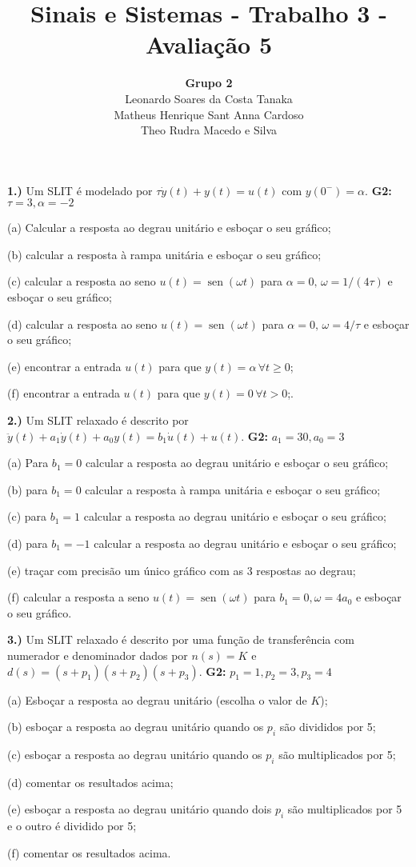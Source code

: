 \documentclass{article}
\title{Sinais e Sistemas - Trabalho 3 - Avaliação 5}
\author{
    \textbf{Grupo 2}\\
    Leonardo Soares da Costa Tanaka\\
    Matheus Henrique Sant Anna Cardoso\\
    Theo Rudra Macedo e Silva
}
\date{}
\DeclareMathOperator{\sen}{sen}
\begin{document}
\maketitle
\thispagestyle{capa}

\newpage

\textbf{1.)} Um SLIT é modelado por $\tau \dot{y}(t) + y(t) = u(t)$ com $y(0^{-}) = \alpha$.
\textbf{G2:} $\tau = 3, \alpha = -2$

(a) Calcular a resposta ao degrau unitário e esboçar o seu gráfico;

(b) calcular a resposta à rampa unitária e esboçar o seu gráfico;

(c) calcular a resposta ao seno $u(t) = \sen(\omega t)$ para $\alpha = 0,\, \omega = 1/(4\tau)$ e esboçar o seu gráfico;

(d) calcular a resposta ao seno $u(t) = \sen(\omega t)$ para $\alpha = 0,\, \omega = 4/\tau$ e esboçar o seu gráfico;

(e) encontrar a entrada $u(t)$ para que $y(t) = \alpha\,\forall t \geq 0$;

(f) encontrar a entrada $u(t)$ para que  $y(t) = 0\,\forall t > 0$;.


\vspace{\baselineskip}


\textbf{2.)} Um SLIT relaxado é descrito por $\ddot{y}(t) + a_1\dot{y}(t) + a_0y(t) = b_1\dot{u}(t) + u(t)$.
\textbf{G2:} $a_1 = 30, a_0 = 3$

(a) Para $b_1 = 0$ calcular a resposta ao degrau unitário e esboçar o seu gráfico;

(b) para $b_1 = 0$ calcular a resposta à rampa unitária e esboçar o seu gráfico;

(c) para $b_1 = 1$ calcular a resposta ao degrau unitário e esboçar o seu gráfico;

(d) para $b_1 = -1$ calcular a resposta ao degrau unitário e esboçar o seu gráfico;

(e) traçar com precisão um único gráfico com as 3 respostas ao degrau;

(f) calcular a resposta a seno $u(t) = \sen(\omega t)$ para $b_1 = 0, \omega = 4a_0$ e esboçar o seu gráfico.


\vspace{\baselineskip}

\textbf{3.)} Um SLIT relaxado é descrito por uma função de transferência com numerador e denominador dados por $n(s) = K$ e $d(s) = (s + p_1)(s + p_2)(s + p_3)$.
\textbf{G2:} $p_1 = 1, p_2 = 3, p_3 = 4$

(a) Esboçar a resposta ao degrau unitário (escolha o valor de $K$);

(b) esboçar a resposta ao degrau unitário quando os $p_i$ são divididos por 5;

(c) esboçar a resposta ao degrau unitário quando os $p_i$ são multiplicados por 5;

(d) comentar os resultados acima;

(e) esboçar a resposta ao degrau unitário quando dois $p_i$ são multiplicados por 5 e o outro é dividido por 5;

(f) comentar os resultados acima.
\end{document}
